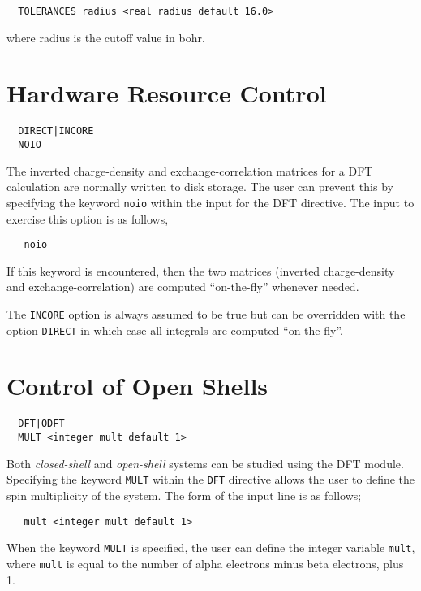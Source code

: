 \begin{verbatim}
  TOLERANCES radius <real radius default 16.0>
\end{verbatim}

where radius is the cutoff value in bohr.


\section{Hardware Resource Control}
\begin{verbatim}
  DIRECT|INCORE
  NOIO
\end{verbatim}

\sloppy

The inverted charge-density and exchange-correlation matrices
for a DFT calculation are normally written to disk storage.  The user
can prevent this by specifying the keyword \verb+noio+ within the
input for the DFT directive.  The input to exercise this option is
as follows,
\begin{verbatim}
   noio
\end{verbatim}
If this keyword is encountered, then the two matrices (inverted
charge-density and exchange-correlation) are computed ``on-the-fly''
whenever needed.  

The \verb+INCORE+ option is always assumed to be true but can be
overridden with the option \verb+DIRECT+ in which case all integrals
are computed ``on-the-fly''.

\fussy

\section{Control of Open Shells}
\begin{verbatim}
  DFT|ODFT
  MULT <integer mult default 1>
\end{verbatim}

Both {\sl closed-shell} and {\sl open-shell} systems can be studied using
the DFT module.  Specifying the keyword \verb+MULT+ within the \verb+DFT+
directive allows the user to define the spin multiplicity of the system.
The form of the input line is as follows;

\begin{verbatim}
   mult <integer mult default 1> 
\end{verbatim}

When the keyword \verb+MULT+ is specified, the user can define the integer
variable \verb+mult+, where \verb+mult+ is equal to the number of alpha 
electrons minus beta electrons, plus 1.

